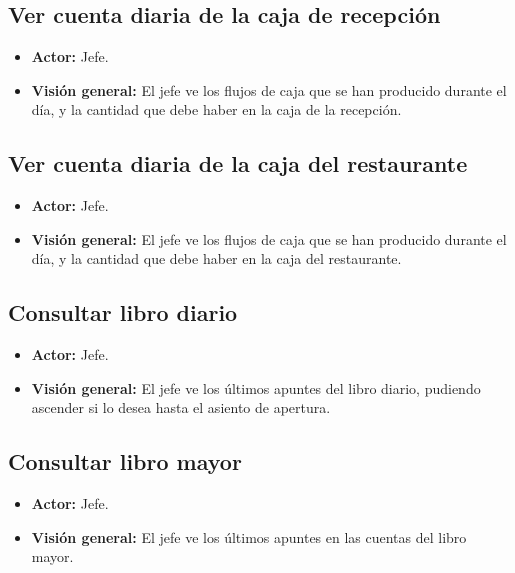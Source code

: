 \documentclass[spanish,a4paper,11pt, twoside]{report}	%
\begin{document}
	\subsection{Ver cuenta diaria de la caja de recepción}
		\begin{itemize}
			\item \textbf{Actor:} Jefe.
			\item \textbf{Visión general:} El jefe ve los flujos de caja que se han producido durante el día, y la cantidad que debe haber en la caja de la recepción.	
		\end {itemize}


	\subsection{Ver cuenta diaria de la caja del restaurante}
		\begin{itemize}
			\item \textbf{Actor:} Jefe.
			\item \textbf{Visión general:} El jefe ve los flujos de caja que se han producido durante el día, y la cantidad que debe haber en la caja del restaurante.	
		\end {itemize}


	\subsection{Consultar libro diario}
		\begin{itemize}
			\item \textbf{Actor:} Jefe.
			\item \textbf{Visión general:} El jefe ve los últimos apuntes del libro diario, pudiendo ascender si lo desea hasta el asiento de apertura.	
		\end {itemize}


	\subsection{Consultar libro mayor}
		\begin{itemize}
			\item \textbf{Actor:} Jefe.
			\item \textbf{Visión general:} El jefe ve los últimos apuntes en las cuentas del libro mayor. 
		\end {itemize}



\newpage
\mbox{}
\thispagestyle{empty}						%
\newpage
\end{document}
